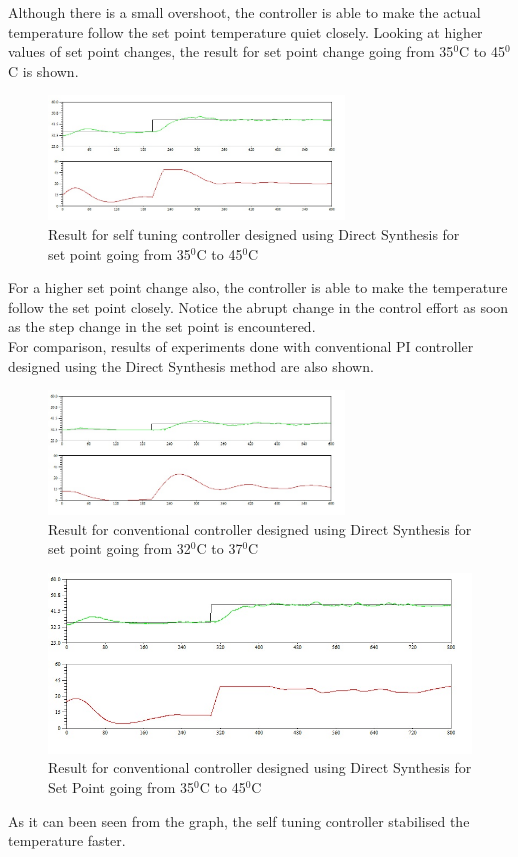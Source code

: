 Although there is a small overshoot, the controller is able to make the actual temperature follow the set point temperature 
quiet closely. Looking at higher values of set point changes, the result for set point change going from 35$^0$C to 45$^0$C 
is shown.
\begin{figure}[h]
	\centering
\includegraphics[width=0.7\textwidth]{Vikas_self/report_tex/PID_results/self_tuning/NewSetpoint_change/DirectSynthesis/step35to45.jpg}
	\caption{Result for self tuning controller designed using Direct Synthesis for set point going from 35$^0$C to 45$^0$C }
	\label{fig:step35to45}
\end{figure}

For a higher set point change also, the controller is able to make the temperature follow the set point closely. Notice the abrupt change in the control effort as soon as the step change in the set point is encountered.\\For comparison, results of experiments done with conventional PI controller designed using the Direct Synthesis method are also shown.

\begin{figure}[h]
	\centering
\includegraphics[width=0.7\textwidth]{Vikas_self/report_tex/PID_results/Conventional_Tuning/Setpointchange/Direct_Synthesis/step32to37.jpg}
	\caption{Result for conventional controller designed using Direct Synthesis for set point going from 32$^0$C to 37$^0$C }
\end{figure}

\begin{figure}[h]
	\centering
\includegraphics[width=.7\textwidth]{Vikas_self/report_tex/PID_results/Conventional_Tuning/Setpointchange/Direct_Synthesis/step35to45.jpg}
	\caption{Result for conventional controller designed using Direct Synthesis for Set Point going from 35$^0$C to 45$^0$C }
\end{figure}
As it can been seen from the graph, the self tuning controller stabilised the temperature faster.
\newpage


